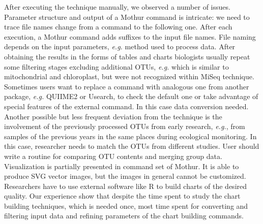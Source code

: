 \documentclass[a4paper]{jpconf}
\begin{document}
After executing the technique manually, we observed a number of issues. Parameter structure and output of a Mothur command is intricate: we need to trace file names change from a command to the following one.  After each execution, a Mothur command adds suffixes to the input file names.  File naming depends on the input parameters, \emph{e.g.} method used to process data. %
After obtaining the results in the forms of tables and charts biologists usually repeat some filtering stages excluding additional OTUs, \emph{e.g.} which is similar to mitochondrial and chloroplast, but were not recognized within MiSeq technique.
Sometimes users want to replace a command with analogous one from another package, \emph{e.g.} QUIIME2 or Usearch, to check the default one or take advantage of special features of the external command. In this case data conversion needed.
Another possible but less frequent deviation from the technique is the involvement of the previously processed OTUs from early research, \emph{e.g.}, from samples of the previous years in the same places during ecological monitoring. In this case, researcher needs to match the OTUs from different studies. User should write a routine for comparing OTU contents and merging group data.
Visualization is partially presented in command set of Mothur.  It is able to produce SVG vector images, but the images in general cannot be customized.  Researchers have to use external software like R to build charts of the desired quality.  Our experience show that despite the time spent to study the chart building techniques, which is needed once, most time spent for converting and filtering input data and refining parameters of the chart building commands.

\end{document}
